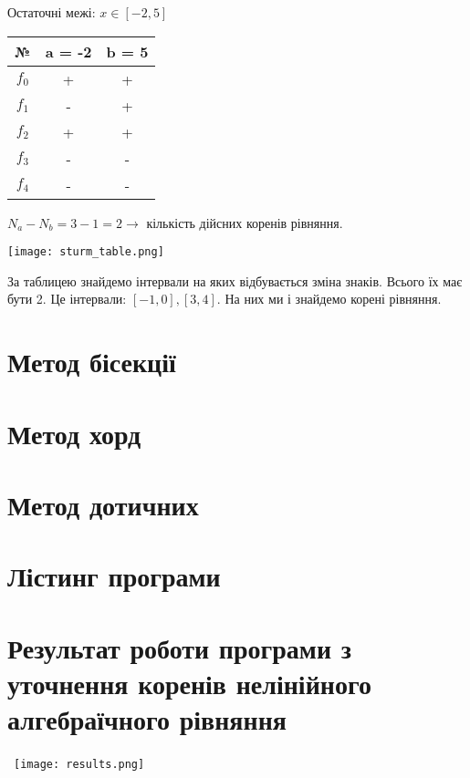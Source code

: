 \documentclass{report}
\begin{document}
Остаточні межі: $x \in \left[-2, 5\right]$
\begin{center}
\begin{tabular}{||c c c||} 
 \hline
 № & a = -2 & b = 5 \\ [0.5ex] 
 \hline\hline
 $f_0$ & + & +\\ 
 \hline
 $f_1$ & - & +\\
 \hline
 $f_2$ & + & +\\
 \hline
 $f_3$ & - & -\\
 \hline
 $f_4$ & - & -\\ [1ex] 
 \hline
\end{tabular}
\end{center}
$N_a - N_b = 3 - 1 = 2 \to $ кількість дійсних коренів рівняння.

\texttt{[image: sturm\_table.png]}

За таблицею знайдемо інтервали на яких відбувається зміна знаків. Всього їх має бути 2. Це інтервали: $\left[-1, 0\right] , \left[3, 4\right]$. На них ми і знайдемо корені рівняння.

\section*{Метод бісекції}


\section*{Метод хорд}


\section*{Метод дотичних}


\section*{Лістинг програми}


\section*{Результат роботи програми з уточнення коренів нелінійного алгебраїчного рівняння}\
\texttt{[image: results.png]}
\end{document}
